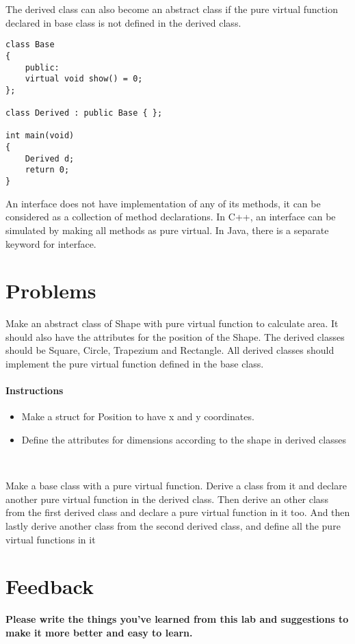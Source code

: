 \documentclass[11pt,fleqn]{book} %
\begin{document}
The derived class can also become an abstract class if the pure virtual function declared in base class is not defined in the derived class.
\begin{example}
\begin{lstlisting}
class Base
{
	public:
	virtual void show() = 0;
};

class Derived : public Base { };

int main(void)
{
	Derived d;
	return 0;
}
\end{lstlisting}
\end{example}
\begin{corollary}
An interface does not have implementation of any of its methods, it can be considered as a collection of method declarations. In C++, an interface can be simulated by making all methods as pure virtual. In Java, there is a separate keyword for interface.
\end{corollary}
\newpage
\section{Problems}
\begin{problem}
	Make an abstract class of Shape with pure virtual function to calculate area. It should also have the attributes for the position of the Shape. The derived classes should be Square, Circle, Trapezium and Rectangle. All derived classes should implement the pure virtual function defined in the base class. 
	\paragraph{Instructions}
	\begin{itemize}
		\item Make a struct for Position to have x and y coordinates.
		\item Define the attributes for dimensions according to the shape in derived classes
	\end{itemize}
\end{problem} ~\\
\begin{problem}
	Make a base class with a pure virtual function. Derive a class from it and declare another pure virtual function in the derived class. Then derive an other class from the first derived class and declare a pure virtual function in it too. And then lastly derive another class from the second derived class, and define all the pure virtual functions in it
\end{problem}
\newpage
\section{Feedback}
\textbf{Please write the things you've learned from this lab and suggestions to make it more better and easy to learn.}
\end{document}
